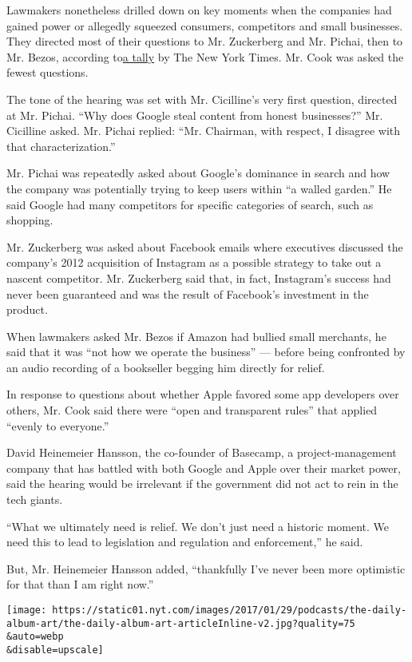 Lawmakers nonetheless drilled down on key moments when the companies had
gained power or allegedly squeezed consumers, competitors and small
businesses. They directed most of their questions to Mr. Zuckerberg and
Mr. Pichai, then to Mr. Bezos, according
to\href{https://www.nytimes.com/live/2020/07/29/technology/tech-ceos-hearing-testimony/heres-which-tech-ceo-is-getting-asked-the-most-questions-by-lawmakers}{a
tally} by The New York Times. Mr. Cook was asked the fewest questions.

The tone of the hearing was set with Mr. Cicilline's very first
question, directed at Mr. Pichai. ``Why does Google steal content from
honest businesses?'' Mr. Cicilline asked. Mr. Pichai replied: ``Mr.
Chairman, with respect, I disagree with that characterization.''

Mr. Pichai was repeatedly asked about Google's dominance in search and
how the company was potentially trying to keep users within ``a walled
garden.'' He said Google had many competitors for specific categories of
search, such as shopping.

Mr. Zuckerberg was asked about Facebook emails where executives
discussed the company's 2012 acquisition of Instagram as a possible
strategy to take out a nascent competitor. Mr. Zuckerberg said that, in
fact, Instagram's success had never been guaranteed and was the result
of Facebook's investment in the product.

When lawmakers asked Mr. Bezos if Amazon had bullied small merchants, he
said that it was ``not how we operate the business'' --- before being
confronted by an audio recording of a bookseller begging him directly
for relief.

In response to questions about whether Apple favored some app developers
over others, Mr. Cook said there were ``open and transparent rules''
that applied ``evenly to everyone.''

David Heinemeier Hansson, the co-founder of Basecamp, a
project-management company that has battled with both Google and Apple
over their market power, said the hearing would be irrelevant if the
government did not act to rein in the tech giants.

``What we ultimately need is relief. We don't just need a historic
moment. We need this to lead to legislation and regulation and
enforcement,'' he said.

But, Mr. Heinemeier Hansson added, ``thankfully I've never been more
optimistic for that than I am right now.''

\texttt{[image: https://static01.nyt.com/images/2017/01/29/podcasts/the-daily-album-art/the-daily-album-art-articleInline-v2.jpg?quality=75\\\&auto=webp\\\&disable=upscale]}

